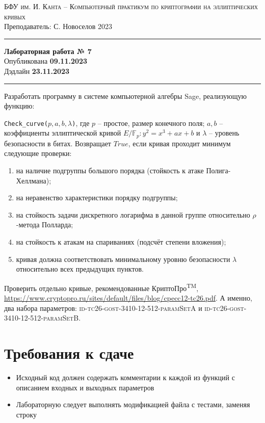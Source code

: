 \documentclass[11pt]{exam}
\theoremstyle{definition}
\begin{document}
	
	{\noindent
		\textsc{БФУ им. И. Канта -- Компьютерный практикум по криптографии на эллиптических кривых }\\[5pt]
		Преподаватель: {С. Новоселов}   \hfill{2023\\}
	\hrule
	\begin{center}
		{\LARGE\textbf{
				Лабораторная работа № 7 \\[5pt]
		}} 
			Опубликована \textbf{09.11.2023} \\[5pt] 
			Дэдлайн \textbf{23.11.2023}
		
	\end{center}
	\hrule \vspace{5mm}
	
	\thispagestyle{empty}
	
	Разработать программу в системе компьютерной алгебры Sage, реализующую функцию:
    
        \texttt{Check\_curve($p, a, b, \lambda$)}, где $p$ -- простое, размер конечного поля; $a, b$ -- коэффициенты эллиптической кривой $E/\mathbb{F}_p: y^2 = x^3 + a x + b$ и  $\lambda$ -- уровень безопасности в битах. Возвращает $True$, если кривая проходит минимум следующие проверки:
        \begin{enumerate}
            \item на наличие подгруппы большого порядка (стойкость к атаке Полига-Хеллмана);
            \item на неравенство характеристики порядку подгруппы;
            \item на стойкость задачи дискретного логарифма в данной группе относительно $\rho$-метода Полларда;
            \item на стойкость к атакам на спариваниях (подсчёт степени вложения);
            \item кривая должна соответствовать минимальному уровню безопасности $\lambda$ относительно всех предыдущих пунктов.
        \end{enumerate}
    
    Проверить отдельно кривые, рекомендованные КриптоПро\textsuperscript{TM}, \url{https://www.cryptopro.ru/sites/default/files/blog/cpecc12-tc26.pdf}. А именно, два набора параметров: \textsc{ id-tc26-gost-3410-12-512-paramSetA} и \textsc{id-tc26-gost-3410-12-512-paramSetB}.
    
    
\normalsize
\section*{Требования к сдаче}
\begin{itemize}
    \item Исходный код должен содержать комментарии к каждой из функций с описанием входных и выходных параметров
    \item Лабораторную следует выполнять модификацией файла с тестами, заменяя строку
    

\end{itemize}}
\end{document}
